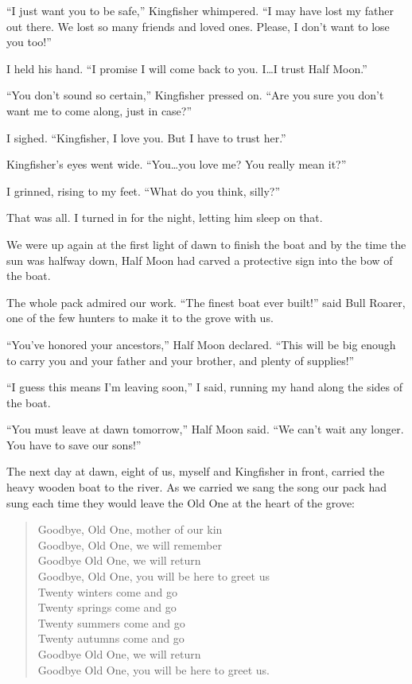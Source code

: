``I just want you to be safe,'' Kingfisher whimpered. ``I may have lost my father out there. We lost so many friends and loved ones. Please, I don't want to lose you too!''

I held his hand. ``I promise I will come back to you. I\ldots{}I trust Half Moon.''

``You don't sound so certain,'' Kingfisher pressed on. ``Are you sure you don't want me to come along, just in case?''

I sighed. ``Kingfisher, I love you. But I have to trust her.''

Kingfisher's eyes went wide. ``You\ldots{}you love me? You really mean it?''

I grinned, rising to my feet. ``What do you think, silly?''

That was all. I turned in for the night, letting him sleep on that.

\secdiv

\noindent We were up again at the first light of dawn to finish the boat and by the time the sun was halfway down, Half Moon had carved a protective sign into the bow of the boat.

The whole pack admired our work. ``The finest boat ever built!'' said Bull Roarer, one of the few hunters to make it to the grove with us.

``You've honored your ancestors,'' Half Moon declared. ``This will be big enough to carry you and your father and your brother, and plenty of supplies!''

``I guess this means I'm leaving soon,'' I said, running my hand along the sides of the boat.

``You must leave at dawn tomorrow,'' Half Moon said. ``We can't wait any longer. You have to save our sons!''

\secdiv

\noindent The next day at dawn, eight of us, myself and Kingfisher in front, carried the heavy wooden boat to the river. As we carried we sang the song our pack had sung each time they would leave the Old One at the heart of the grove:

\begin{verse}
Goodbye, Old One, mother of our kin \\
Goodbye, Old One, we will remember \\
Goodbye Old One, we will return \\
Goodbye, Old One, you will be here to greet us \\
Twenty winters come and go \\
Twenty springs come and go \\
Twenty summers come and go \\
Twenty autumns come and go \\
Goodbye Old One, we will return \\
Goodbye Old One, you will be here to greet us.
\end{verse}

